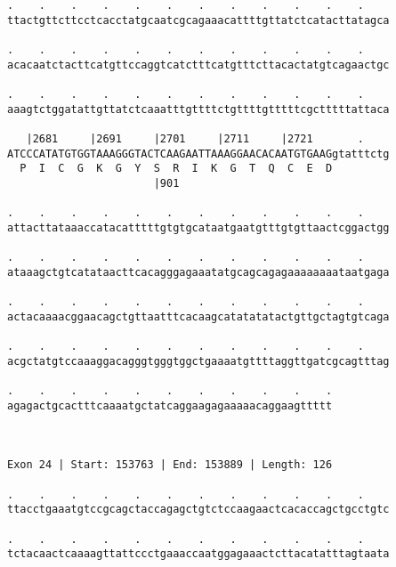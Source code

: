 \documentclass{article}
\begin{document}
\begin{Verbatim}
.    .    .    .    .    .    .    .    .    .    .    .    
ttactgttcttcctcacctatgcaatcgcagaaacattttgttatctcatacttatagca
                                                            
.    .    .    .    .    .    .    .    .    .    .    .    
acacaatctacttcatgttccaggtcatctttcatgtttcttacactatgtcagaactgc
                                                            
.    .    .    .    .    .    .    .    .    .    .    .    
aaagtctggatattgttatctcaaatttgttttctgttttgtttttcgctttttattaca
                                                            
   |2681     |2691     |2701     |2711     |2721       .    
ATCCCATATGTGGTAAAGGGTACTCAAGAATTAAAGGAACACAATGTGAAGgtatttctg
  P  I  C  G  K  G  Y  S  R  I  K  G  T  Q  C  E  D         
                       |901                                 
  
.    .    .    .    .    .    .    .    .    .    .    .    
attacttataaaccatacatttttgtgtgcataatgaatgtttgtgttaactcggactgg
                                                            
.    .    .    .    .    .    .    .    .    .    .    .    
ataaagctgtcatataacttcacagggagaaatatgcagcagagaaaaaaaataatgaga
                                                            
.    .    .    .    .    .    .    .    .    .    .    .    
actacaaaacggaacagctgttaatttcacaagcatatatatactgttgctagtgtcaga
                                                            
.    .    .    .    .    .    .    .    .    .    .    .    
acgctatgtccaaaggacagggtgggtggctgaaaatgttttaggttgatcgcagtttag
                                                            
.    .    .    .    .    .    .    .    .    .    .
agagactgcactttcaaaatgctatcaggaagagaaaaacaggaagttttt
                                                   
                                                   
 
Exon 24 | Start: 153763 | End: 153889 | Length: 126
 
.    .    .    .    .    .    .    .    .    .    .    .    
ttacctgaaatgtccgcagctaccagagctgtctccaagaactcacaccagctgcctgtc
                                                            
.    .    .    .    .    .    .    .    .    .    .    .    
tctacaactcaaaagttattccctgaaaccaatggagaaactcttacatatttagtaata
                                                            

\end{Verbatim}
\end{document}
